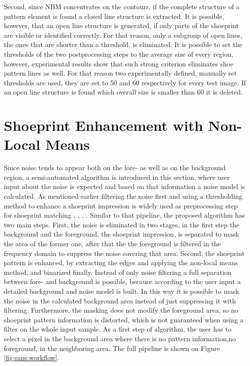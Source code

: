 \documentclass[draft,final]{vutinfth} %
\begin{document}
Second, since NBM concentrates on the contours, if the complete structure of a pattern element is found a closed line structure is extracted.
It is possible, however, that an open line structure is generated,  if only parts of the shoeprint are visible or identified correctly.
For that reason, only a subgroup of open lines, the ones that are shorter than a threshold, is eliminated.
It is possible to set the thresholds of the two postprocessing steps to the average size of every region, however, experimental results show that such strong criterion eliminates shoe pattern lines as well.
For that reason two experimentally defined, manually set thresholds are used, they are set to 50 and 60 respectively for every test image.
If an open line structure is found which overall size is smaller than 60 it is deleted.

\section{Shoeprint Enhancement with Non-Local Means}
\par
Since noise tends to appear both on the fore- as well as on the background region, a semi-automated algorithm is introduced in this section, where user input about the noise is expected and based on that information a noise model is calculated.
As mentioned earlier filtering the noise first and using a thresholding method to enhance a shoeprint impression is widely used as preprocessing step for shoeprint matching \cite{alizadeh2017automatic}, \cite{wang2014automatic}, \cite{li2014retrieval}, \cite{kong2014novel}.
Similar to that pipeline, the proposed algorithm has two main steps.
First, the noise is eliminated in two stages, in the first step the background and the foreground, the shoeprint impression, is separated to mask the area of the former one, after that the the foreground is filtered in the frequency domain to suppress  the noise covering that area.
Second, the shoeprint pattern is enhanced, by extracting the edges and applying the non-local means method, and binarized finally.
Instead of only noise filtering a full separation between fore- and background is possible, because according to the user input a detailed background and noise model is built.
In this way it is possible to mask the noise in the calculated background area instead of just suppressing it with filtering.
Furthermore, the masking does not modify the foreground area, so no shoeprint pattern information is distorted, which is not guaranteed when using a filter on the whole input sample.
As a first step of algorithm, the user has to select a pixel in the background area where there is no pattern information,no foreground, in the neighboring area.
The full pipeline is shown on Figure \ref{fig:sans:workflow}.
\end{document}
